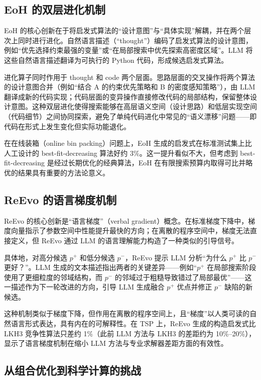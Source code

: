 \subsection{EoH 的双层进化机制}

EoH 的核心创新在于将启发式算法的“设计意图”与“具体实现”解耦，并在两个层次上同时进行进化。自然语言描述（“thought”）编码了启发式算法的设计意图，例如“优先选择约束最强的变量”或“在局部搜索中优先探索高密度区域”。LLM 将这些自然语言描述翻译为可执行的 Python 代码，形成候选启发式算法。

进化算子同时作用于 thought 和 code 两个层面。思路层面的交叉操作将两个算法的设计意图合并（例如“结合 A 的约束优先策略和 B 的密度感知策略”），由 LLM 翻译成新的代码实现；代码层面的变异操作直接修改代码的局部结构，保留整体设计意图。这种双层进化使得搜索能够在高层语义空间（设计思路）和低层实现空间（代码细节）之间协同探索，避免了单纯代码进化中常见的“语义漂移”问题——即代码在形式上发生变化但实际功能退化。

在在线装箱（online bin packing）问题上，EoH 生成的启发式在标准测试集上比人工设计的 best-fit-decreasing 算法好约 3\%。这一提升看似不大，但考虑到 best-fit-decreasing 是经过长期优化的经典算法，EoH 在有限搜索预算内取得可比并略优的结果具有重要的方法论意义。

\subsection{ReEvo 的语言梯度机制}

ReEvo 的核心创新是“语言梯度”（verbal gradient）概念。在标准梯度下降中，梯度向量指示了参数空间中性能提升最快的方向；在离散的程序空间中，梯度无法直接定义，但 ReEvo 通过 LLM 的语言理解能力构造了一种类似的引导信号。

具体地，对高分候选 $p^+$ 和低分候选 $p^-$，ReEvo 提示 LLM 分析“为什么 $p^+$ 比 $p^-$ 更好？”。LLM 生成的文本描述指出两者的关键差异——例如“$p^+$ 在局部搜索阶段使用了更细粒度的邻域结构，而 $p^-$ 的邻域过于粗糙导致错过了局部最优”——这一描述作为下一轮改进的方向，引导 LLM 生成融合 $p^+$ 优点并修正 $p^-$ 缺陷的新候选。

这种机制类似于梯度下降，但作用在离散的程序空间上，且“梯度”以人类可读的自然语言形式表达，具有内在的可解释性。在 TSP 上，ReEvo 生成的构造启发式比 LKH3 竞争性算法只差约 1\%（此前 LLM 方法与 LKH3 的差距约为 10\%--20\%），显示了语言梯度机制在缩小 LLM 方法与专业求解器差距方面的有效性。

\subsection{从组合优化到科学计算的挑战}

